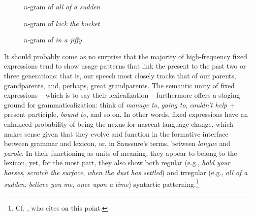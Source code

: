 \documentclass[output=paper]{langsci/langscibook}
\begin{document}
\begin{figure}
    \caption{$n$-gram of \textit{all of a sudden}\label{fig:6:1}} %
\end{figure}

\begin{figure}
\caption{$n$-gram of \textit{kick the bucket}\label{fig:6:2}} %
\label{fig:6:2}
\end{figure}

\begin{figure}
\caption{$n$-gram of \textit{in a jiffy}\label{fig:6:3}} %
\label{fig:6:3}
\end{figure}

It should probably come as no surprise that the majority of high-frequency fixed expressions tend to show usage patterns that link the present to the past two or three generations: that is, our speech most closely tracks that of our parents, grandparents, and, perhaps, great grandparents. The semantic unity of fixed expressions – which is to say their lexicalization – furthermore offers a staging ground for grammaticalization: think of \textit{manage to}, \textit{going to}, \textit{couldn’t help} + present participle, \textit{bound to}, and so on. In other words, fixed expressions have an enhanced probability of being the nexus for nascent language change, which makes sense given that they evolve and function in the formative interface between grammar and lexicon, or, in Saussure’s terms, between \textit{langue} and \textit{parole}. In their functioning as units of meaning, they appear to belong to the lexicon, yet, for the most part, they also show both regular (e.g., \textit{hold your horses}, \textit{scratch the surface}, \textit{when the dust has settled}) and irregular (e.g., \textit{all of a sudden}, \textit{believe you me}, \textit{once upon a time}) syntactic patterning.\footnote{Cf. \citet[2--3]{wood_formulaic_2002}, who cites \citet[36]{richards_two_1983} on this point.}
\end{document}
